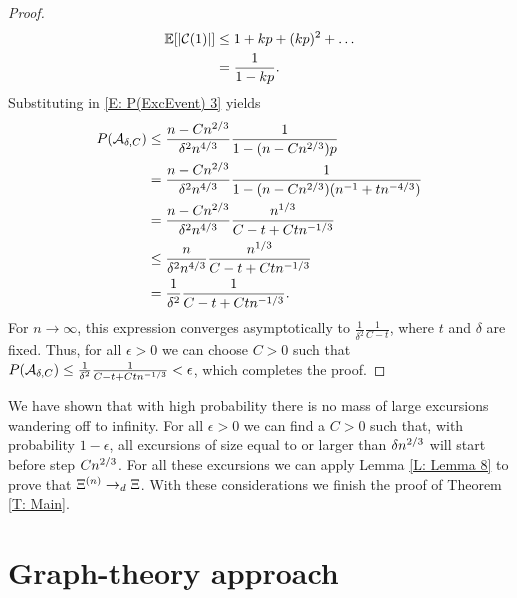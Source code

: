 \begin{proof}
	\begin{align*}
	\mathbb{E}[|\mathcal{C}(1)|] 
	&\leq 1 + kp + (kp)^2 + \dots \\
	&= \frac{1}{1-kp}.
	\end{align*}
	Substituting in \eqref{E: P(ExcEvent) 3} yields
	\begin{equation}
	\begin{aligned}
	P(\mathcal{A}_{\delta, C}) 
	&\leq \frac{n-Cn^{2 / 3}}{\delta^2 n^{4 / 3}} \frac{1}{1-(n-Cn^{2 / 3})p} \\
	&= \frac{n-Cn^{2 / 3}}{\delta^2 n^{4 / 3}} \frac{1}{1-(n-Cn^{2 / 3})(n^{-1} + tn^{-4 / 3})} \\
	&= \frac{n-Cn^{2 / 3}}{\delta^2 n^{4 / 3}} \frac{n^{1 / 3}}{C-t+Ctn^{-1 / 3}} \\
	&\leq \frac{n}{\delta^2 n^{4 / 3}} \frac{n^{1 / 3}}{C-t+Ctn^{-1 / 3}} \\
	&= \frac{1}{\delta^2} \frac{1}{C-t+Ctn^{-1 / 3}}.
	\end{aligned}
	\end{equation}
	For $n \rightarrow \infty$, 
	this expression converges asymptotically to $\frac{1}{\delta^2} \frac{1}{C-t}$,
	where $t$ and $\delta$ are fixed.
	Thus, for all $\epsilon>0$ we can choose $C>0$ such that
	$P(\mathcal{A}_{\delta, C}) \leq \frac{1}{\delta^2} \frac{1}{C-t+Ctn^{-1 / 3}} < \epsilon$,
	which completes the proof.
\end{proof}

We have shown that with high probability there is no mass of large excursions wandering off to infinity.
For all $\epsilon>0$ we can find a $C>0$ such that,
with probability $1-\epsilon$,
all excursions of size equal to or larger than $\delta n^{2 / 3}$ will start before step $Cn^{2 / 3}$.
For all these excursions we can apply Lemma \ref{L: Lemma 8} to prove that $\Xi^{(n)} \rightarrow_d \Xi$.
With these considerations we finish the proof of Theorem \ref{T: Main}.

\section{Graph-theory approach}



